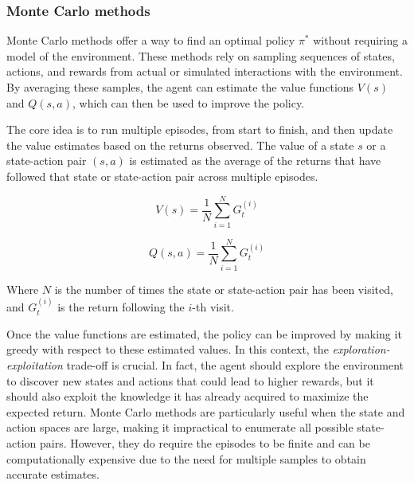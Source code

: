 \subsubsection{Monte Carlo methods}
Monte Carlo methods offer a way to find an optimal policy \(\pi^*\) without requiring a model of the environment. 
 These methods rely on sampling sequences of states, actions, and rewards from actual or simulated interactions with the environment. 
 By averaging these samples, the agent can estimate the value functions \(V(s)\) and \(Q(s, a)\), which can then be used to improve the policy.

The core idea is to run multiple episodes, 
 from start to finish, and then update the value estimates based on the returns observed. 
 The value of a state \(s\) or a state-action pair \((s, a)\) is estimated as the average of the returns that have followed that state or state-action pair across multiple episodes.

\begin{equation}
V(s) = \frac{1}{N} \sum_{i=1}^{N} G_t^{(i)}
\end{equation}

\begin{equation}
Q(s, a) = \frac{1}{N} \sum_{i=1}^{N} G_t^{(i)}
\end{equation}

Where \(N\) is the number of times the state or state-action pair has been visited, and \(G_t^{(i)}\) is the return following the \(i\)-th visit.

Once the value functions are estimated, 
 the policy can be improved by making it greedy with respect to these estimated values. 
%
In this context, the \emph{exploration-exploitation} trade-off is crucial.
%
In fact, the agent should explore the environment to discover new states and actions that could lead to higher rewards,
  but it should also exploit the knowledge it has already acquired to maximize the expected return.
%
Monte Carlo methods are particularly useful when the state and action spaces are large, making it impractical to enumerate all possible state-action pairs. However, they do require the episodes to be finite and can be computationally expensive due to the need for multiple samples to obtain accurate estimates.

